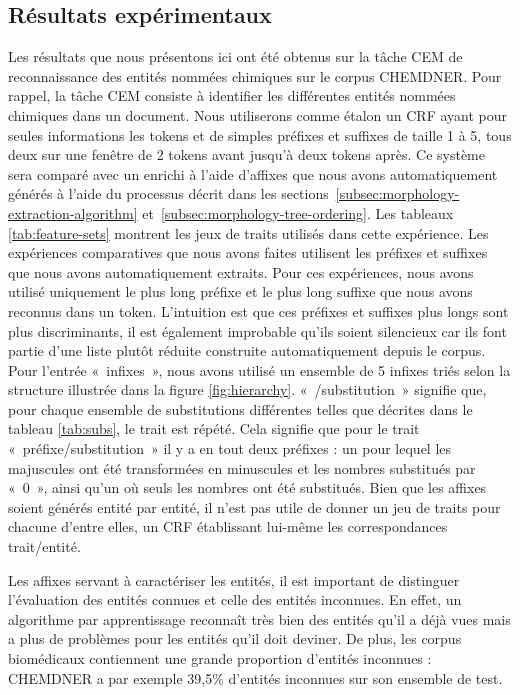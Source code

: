 \documentclass[12pt,a4paper,times,twoside,openright]{report}
\begin{document}
        \subsection{Résultats expérimentaux}
        \label{subsec:morphology-mined-affixes-results}
Les résultats que nous présentons ici ont été obtenus sur la tâche CEM de reconnaissance des entités nommées chimiques sur le corpus CHEMDNER. Pour rappel, la tâche CEM consiste à identifier les différentes entités nommées chimiques dans un document. Nous utiliserons comme étalon un CRF ayant pour seules informations les tokens et de simples préfixes et suffixes de taille 1 à 5, tous deux sur une fenêtre de 2 tokens avant jusqu'à deux tokens après. Ce système sera comparé avec un enrichi à l'aide d'affixes que nous avons automatiquement générés à l'aide du processus décrit dans les sections\ \ref{subsec:morphology-extraction-algorithm} et\ \ref{subsec:morphology-tree-ordering}. Les tableaux \ref{tab:feature-sets} montrent les jeux de traits utilisés dans cette expérience. Les expériences comparatives que nous avons faites utilisent les préfixes et suffixes que nous avons automatiquement extraits. Pour ces expériences, nous avons utilisé uniquement le plus long préfixe et le plus long suffixe que nous avons reconnus dans un token. L'intuition est que ces préfixes et suffixes plus longs sont plus discriminants, il est également improbable qu'ils soient silencieux car ils font partie d'une liste plutôt réduite construite automatiquement depuis le corpus. Pour l'entrée «\ infixes\ », nous avons utilisé un ensemble de 5 infixes triés selon la structure illustrée dans la figure \ref{fig:hierarchy}. «\ /substitution\ » signifie que, pour chaque ensemble de substitutions différentes telles que décrites dans le tableau \ref{tab:subs}, le trait est répété. Cela signifie que pour le trait «\ préfixe/substitution\ » il y a en tout deux préfixes : un pour lequel les majuscules ont été transformées en minuscules et les nombres substitués par «\ 0\ », ainsi qu'un où seuls les nombres ont été substitués. Bien que les affixes soient générés entité par entité, il n'est pas utile de donner un jeu de traits pour chacune d'entre elles, un CRF établissant lui-même les correspondances trait/entité.

Les affixes servant à caractériser les entités, il est important de distinguer l'évaluation des entités connues et celle des entités inconnues. En effet, un algorithme par apprentissage reconnaît très bien des entités qu'il a déjà vues mais a plus de problèmes pour les entités qu'il doit deviner. De plus, les corpus biomédicaux contiennent une grande proportion d'entités inconnues : CHEMDNER a par exemple 39,5\% d'entités inconnues sur son ensemble de test.%
\end{document}
